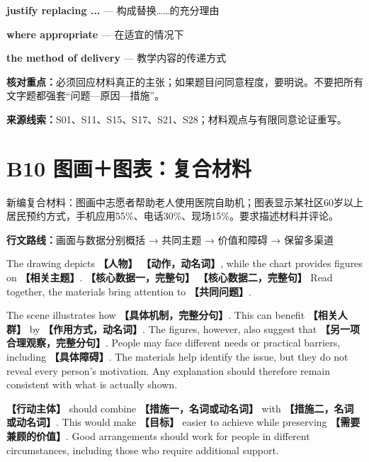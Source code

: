 \documentclass[11pt,a4paper,fontset=macnew]{ctexart}
\newenvironment{writing}{\begingroup\fontsize{10.5}{13.5}\selectfont\setlength{\parskip}{3pt}}{\par\endgroup}
\begin{document}
\par\vspace{4pt}{\bfseries 好词好句：优先记这三处}\par\nopagebreak
{\small\textbf{justify replacing ...} — 构成替换……的充分理由}\par
{\small\textbf{where appropriate} — 在适宜的情况下}\par
{\small\textbf{the method of delivery} — 教学内容的传递方式}\par
{\small\textbf{核对重点：}必须回应材料真正的主张；如果题目问同意程度，要明说。不要把所有文字题都强套“问题—原因—措施”。}\par
{\fontsize{8}{10}\selectfont\textbf{来源线索：}S01、S11、S15、S17、S21、S28；材料观点与有限同意论证重写。}\par
\clearpage\section*{B10  图画＋图表：复合材料}
{\small 新编复合材料：图画中志愿者帮助老人使用医院自助机；图表显示某社区60岁以上居民预约方式，手机应用55\%、电话30\%、现场15\%。要求描述材料并评论。}\par
{\small\textbf{行文路线：}画面与数据分别概括 → 共同主题 → 价值和障碍 → 保留多渠道}\par
\par\vspace{4pt}{\bfseries 可替换模板}\par\nopagebreak
\begin{writing}
The drawing depicts {\bfseries 【人物】} {\bfseries 【动作，动名词】}, while the chart provides figures on {\bfseries 【相关主题】}. {\bfseries 【核心数据一，完整句】} {\bfseries 【核心数据二，完整句】} Read together, the materials bring attention to {\bfseries 【共同问题】}.

The scene illustrates how {\bfseries 【具体机制，完整分句】}. This can benefit {\bfseries 【相关人群】} by {\bfseries 【作用方式，动名词】}. The figures, however, also suggest that {\bfseries 【另一项合理观察，完整分句】}. People may face different needs or practical barriers, including {\bfseries 【具体障碍】}. The materials help identify the issue, but they do not reveal every person's motivation. Any explanation should therefore remain consistent with what is actually shown.

{\bfseries 【行动主体】} should combine {\bfseries 【措施一，名词或动名词】} with {\bfseries 【措施二，名词或动名词】}. This would make {\bfseries 【目标】} easier to achieve while preserving {\bfseries 【需要兼顾的价值】}. Good arrangements should work for people in different circumstances, including those who require additional support.

\end{writing}
\end{document}
